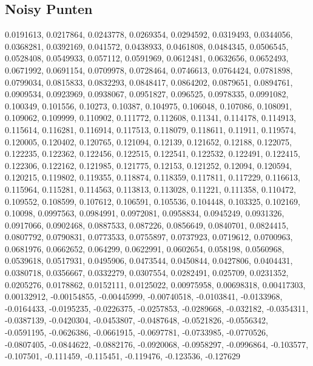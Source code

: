 \documentclass[10pt,a4paper,twocolumn]{article}
\begin{document}
\subsection{Noisy Punten}
0.0191613, 0.0217864, 0.0243778, 0.0269354, 0.0294592, 0.0319493, 0.0344056, 0.0368281, 0.0392169, 0.041572, 0.0438933, 0.0461808, 0.0484345, 0.0506545, 0.0528408, 0.0549933, 0.057112, 0.0591969, 0.0612481, 0.0632656, 0.0652493, 0.0671992, 0.0691154, 0.0709978, 0.0728464, 0.0746613, 0.0764424, 0.0781898, 0.0799034, 0.0815833, 0.0832293, 0.0848417, 0.0864202, 0.0879651, 0.0894761, 0.0909534, 0.0923969, 0.0938067, 0.0951827, 0.096525, 0.0978335, 0.0991082, 0.100349, 0.101556, 0.10273, 0.10387, 0.104975, 0.106048, 0.107086, 0.108091, 0.109062, 0.109999, 0.110902, 0.111772, 0.112608, 0.11341, 0.114178, 0.114913, 0.115614, 0.116281, 0.116914, 0.117513, 0.118079, 0.118611, 0.11911, 0.119574, 0.120005, 0.120402, 0.120765, 0.121094, 0.12139, 0.121652, 0.12188, 0.122075, 0.122235, 0.122362, 0.122456, 0.122515, 0.122541, 0.122532, 0.122491, 0.122415, 0.122306, 0.122162, 0.121985, 0.121775, 0.12153, 0.121252, 0.12094, 0.120594, 0.120215, 0.119802, 0.119355, 0.118874, 0.118359, 0.117811, 0.117229, 0.116613, 0.115964, 0.115281, 0.114563, 0.113813, 0.113028, 0.11221, 0.111358, 0.110472, 0.109552, 0.108599, 0.107612, 0.106591, 0.105536, 0.104448, 0.103325, 0.102169, 0.10098, 0.0997563, 0.0984991, 0.0972081, 0.0958834, 0.0945249, 0.0931326, 0.0917066, 0.0902468, 0.0887533, 0.087226, 0.0856649, 0.0840701, 0.0824415, 0.0807792, 0.0790831, 0.0773533, 0.0755897, 0.0737923, 0.0719612, 0.0700963, 0.0681976, 0.0662652, 0.064299, 0.0622991, 0.0602654, 0.058198, 0.0560968, 0.0539618, 0.0517931, 0.0495906, 0.0473544, 0.0450844, 0.0427806, 0.0404431, 0.0380718, 0.0356667, 0.0332279, 0.0307554, 0.0282491, 0.025709, 0.0231352, 0.0205276, 0.0178862, 0.0152111, 0.0125022, 0.00975958, 0.00698318, 0.00417303, 0.00132912, -0.00154855, -0.00445999, -0.00740518, -0.0103841, -0.0133968, -0.0164433, -0.0195235, -0.0226375, -0.0257853, -0.0289668, -0.032182, -0.0354311, -0.0387139, -0.0420304, -0.0453807, -0.0487648, -0.0521826, -0.0556342, -0.0591195, -0.0626386, -0.0661915, -0.0697781, -0.0733985, -0.0770526, -0.0807405, -0.0844622, -0.0882176, -0.0920068, -0.0958297, -0.0996864, -0.103577, -0.107501, -0.111459, -0.115451, -0.119476, -0.123536, -0.127629
\end{document}
